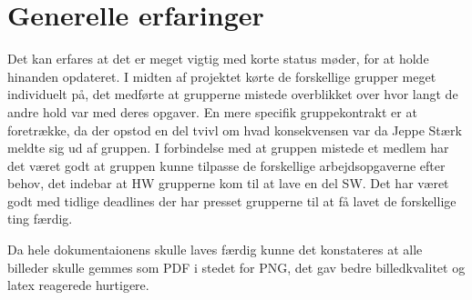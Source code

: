 \section{Generelle erfaringer}

Det kan erfares at det er meget vigtig med korte status møder, for at holde hinanden opdateret. I midten af projektet kørte de forskellige grupper meget individuelt på, det medførte at grupperne mistede overblikket over hvor langt de andre hold var med deres opgaver. En mere specifik gruppekontrakt er at foretrække, da der opstod en del tvivl om hvad konsekvensen var da Jeppe Stærk meldte sig ud af gruppen. I forbindelse med at gruppen mistede et medlem har det været godt at gruppen kunne tilpasse de forskellige arbejdsopgaverne efter behov, det indebar at HW grupperne kom til at lave en del SW. Det har været godt med tidlige deadlines der har presset grupperne til at få lavet de forskellige ting færdig.  

Da hele dokumentaionens skulle laves færdig  kunne det konstateres at alle billeder skulle gemmes som PDF i stedet for PNG, det gav bedre billedkvalitet og latex reagerede hurtigere.




